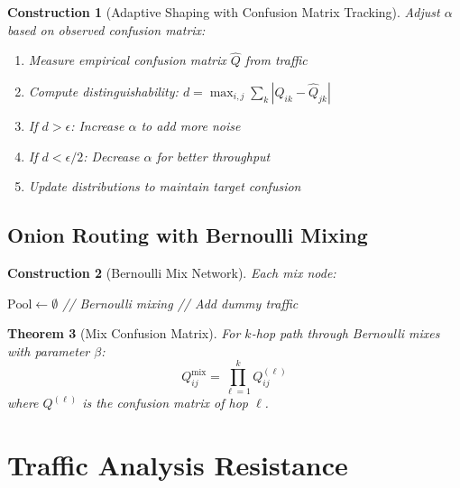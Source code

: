 \documentclass[11pt,final]{article}
\newtheorem{theorem}{Theorem}[section]
\newtheorem{construction}[theorem]{Construction}
\begin{document}
\begin{construction}[Adaptive Shaping with Confusion Matrix Tracking]
Adjust $\alpha$ based on observed confusion matrix:
\begin{enumerate}
    \item Measure empirical confusion matrix $\hat{Q}$ from traffic
    \item Compute distinguishability: $d = \max_{i,j} \sum_k |\hat{Q}_{ik} - \hat{Q}_{jk}|$
    \item If $d > \epsilon$: Increase $\alpha$ to add more noise
    \item If $d < \epsilon/2$: Decrease $\alpha$ for better throughput
    \item Update distributions to maintain target confusion
\end{enumerate}
\end{construction}

\subsection{Onion Routing with Bernoulli Mixing}

\begin{construction}[Bernoulli Mix Network]
Each mix node:
\begin{algorithm}[H]
\caption{Bernoulli Mix Node}
$\text{Pool} \gets \emptyset$\;
// Bernoulli mixing\;
// Add dummy traffic\;
\end{algorithm}
\end{construction}

\begin{theorem}[Mix Confusion Matrix]
For $k$-hop path through Bernoulli mixes with parameter $\beta$:
\begin{equation}
Q^{\text{mix}}_{ij} = \prod_{\ell=1}^k Q^{(\ell)}_{ij}
\end{equation}
where $Q^{(\ell)}$ is the confusion matrix of hop $\ell$.
\end{theorem}

\section{Traffic Analysis Resistance}
\end{document}
